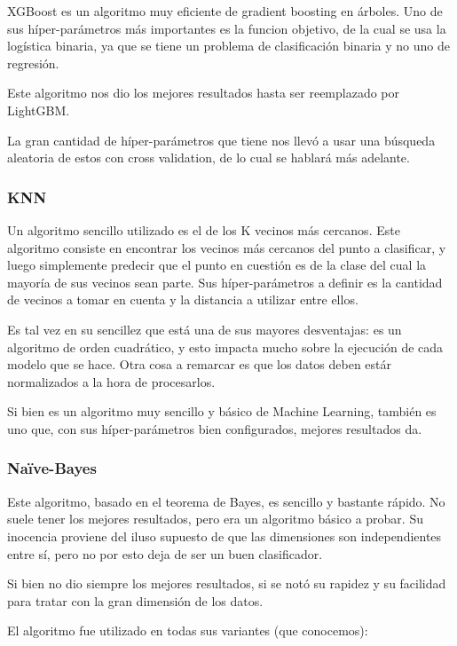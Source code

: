 \documentclass[a4paper]{article}
\begin{document}
XGBoost es un algoritmo muy eficiente de gradient boosting en árboles. Uno de sus híper-parámetros más importantes es la funcion objetivo, de la cual se usa la logística binaria, ya que se tiene un problema de clasificación binaria y no uno de regresión.

Este algoritmo nos dio los mejores resultados hasta ser reemplazado por LightGBM.

La gran cantidad de híper-parámetros que tiene nos llevó a usar una búsqueda aleatoria de estos con cross validation, de lo cual se hablará más adelante.

\subsubsection{KNN}

Un algoritmo sencillo utilizado es el de los K vecinos más cercanos. Este algoritmo consiste en encontrar los vecinos más cercanos del punto a clasificar, y luego simplemente predecir que el punto en cuestión es de la clase del cual la mayoría de sus vecinos sean parte. Sus híper-parámetros a definir es la cantidad de vecinos a tomar en cuenta y la distancia a utilizar entre ellos. 

Es tal vez en su sencillez que está una de sus mayores desventajas: es un algoritmo de orden cuadrático, y esto impacta mucho sobre la ejecución de cada modelo que se hace. Otra cosa a remarcar es que los datos deben estár normalizados a la hora de procesarlos.

Si bien es un algoritmo muy sencillo y básico de Machine Learning, también es uno que, con sus híper-parámetros bien configurados, mejores resultados da. 

\subsubsection{Naïve-Bayes}

Este algoritmo, basado en el teorema de Bayes, es sencillo y bastante rápido. No suele tener los mejores resultados, pero era un algoritmo básico a probar. Su inocencia proviene del iluso supuesto de que las dimensiones son independientes entre sí, pero no por esto deja de ser un buen clasificador.

Si bien no dio siempre los mejores resultados, si se notó su rapidez y su facilidad para tratar con la gran dimensión de los datos.

El algoritmo fue utilizado en todas sus variantes (que conocemos):
\end{document}
